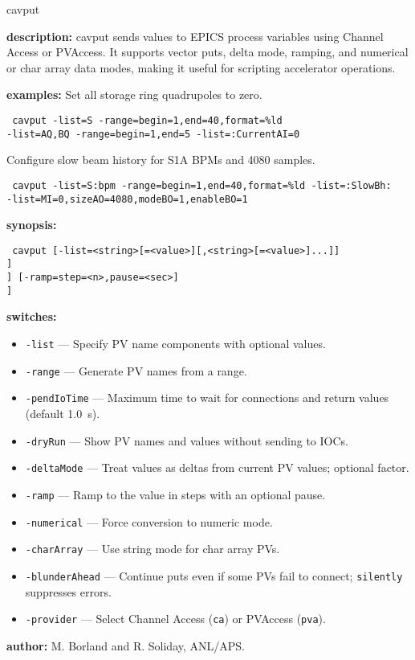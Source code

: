 \begin{sddsprog}{cavput}
  \item {\bf description:}
    cavput sends values to EPICS process variables using Channel Access or PVAccess. It supports vector puts, delta mode, ramping, and numerical or char array data modes, making it useful for scripting accelerator operations.
  \item {\bf examples:}
    Set all storage ring quadrupoles to zero.
    \begin{flushleft}{\tt
    cavput -list=S -range=begin=1,end=40,format=\%ld\\
      -list=AQ,BQ -range=begin=1,end=5 -list=:CurrentAI=0
    }\end{flushleft}
    Configure slow beam history for S1A BPMs and 4080 samples.
    \begin{flushleft}{\tt
    cavput -list=S:bpm -range=begin=1,end=40,format=\%ld -list=:SlowBh:\\
      -list=MI=0,sizeAO=4080,modeBO=1,enableBO=1
    }\end{flushleft}
  \item {\bf synopsis:}
    \begin{flushleft}{\tt
    cavput [-list=<string>[=<value>][,<string>[=<value>]...]]\\\relax
      [-range=begin=<integer>,end=<integer>[,format=<string>][,interval=<integer>]]\\\relax
      [-pendIoTime=<seconds>] [-dryRun] [-deltaMode[=factor=<value>]] [-ramp=step=<n>,pause=<sec>]\\\relax
      [-numerical] [-charArray] [-blunderAhead[=silently]]\\\relax
      [-provider=\{ca|pva\}]
    }\end{flushleft}
  \item {\bf switches:}
    \begin{itemize}
      \item {\tt -list} --- Specify PV name components with optional values.
      \item {\tt -range} --- Generate PV names from a range.
      \item {\tt -pendIoTime} --- Maximum time to wait for connections and return values (default 1.0~s).
      \item {\tt -dryRun} --- Show PV names and values without sending to IOCs.
      \item {\tt -deltaMode} --- Treat values as deltas from current PV values; optional factor.
      \item {\tt -ramp} --- Ramp to the value in steps with an optional pause.
      \item {\tt -numerical} --- Force conversion to numeric mode.
      \item {\tt -charArray} --- Use string mode for char array PVs.
      \item {\tt -blunderAhead} --- Continue puts even if some PVs fail to connect; \verb|silently| suppresses errors.
      \item {\tt -provider} --- Select Channel Access ({\tt ca}) or PVAccess ({\tt pva}).
    \end{itemize}
  \item {\bf author:} M. Borland and R. Soliday, ANL/APS.
\end{sddsprog}
